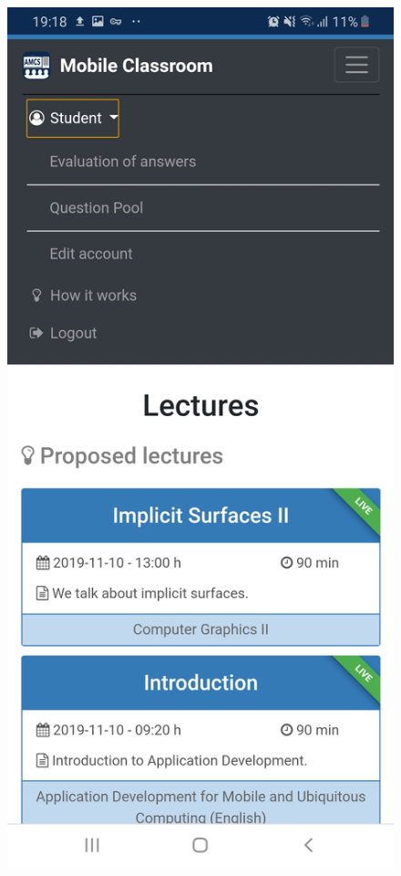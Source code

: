 \begin{figure}
	\centering
	\begin{minipage}[t]{.5\textwidth}
		\centering
		\includegraphics[width=0.95\linewidth]{screenshots/expanded_burger_menu.jpg}

\end{minipage}
\end{figure}
